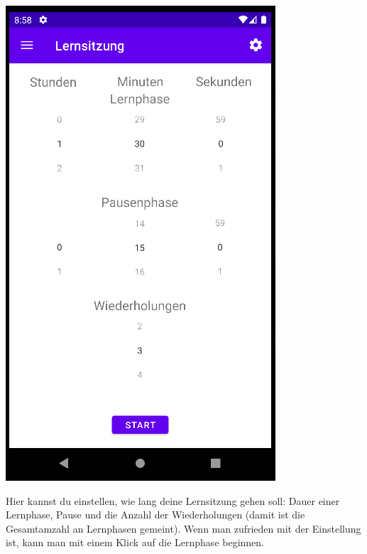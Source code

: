 \documentclass[ngerman]{tutorial}
\begin{document}
\begin{center}
    \includegraphics[scale=0.6]{learn_start.png}
\end{center}
Hier kannst du einstellen, wie lang deine Lernsitzung gehen soll: Dauer einer Lernphase, Pause und die Anzahl der Wiederholungen (damit ist die Gesamtamzahl an Lernphasen gemeint). Wenn man zufrieden mit der Einstellung ist, kann man mit einem Klick auf  die Lernphase beginnen.
\end{document}
